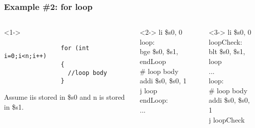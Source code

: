 \documentclass[
	10pt, %
	hmargin=1cm,vmargin=0cm,head=0.5cm,headsep=0pt,foot=0.5cm,margin=2cm
]{beamer}
\begin{document}
\begin{frame}[fragile]
	\frametitle{Example \#2: for loop}
	\begin{columns}[c]
		\begin{column}{0.3\textwidth}<1->
			\begin{listing}[H]
			\centering			
			\begin{verbatim}
				for (int i=0;i<n;i++)
				{
				  //loop body
				}
			\end{verbatim}
			\end{listing}
			\begin{flushleft}
				Assume \color{red}i\color{black}\hspace{0.1cm}is stored in \color{red}\$s0\color{black}\hspace{0.1cm} and \color{red}n\color{black}\hspace{0.1cm} is stored in \color{red}\$s1\color{black}. \pause
			\end{flushleft}
		\end{column}
		\begin{column}{0.3\textwidth}<2->
			\color{blue}li \color{red}\$s0\color{black}, 0 \\
			loop: \\
			\color{blue}bge \color{red}\$s0\color{black}, \color{red}\$s1\color{black}, endLoop \\
			\# loop body \\
			\color{blue}addi \color{red}\$s0\color{black}, \color{red}\$s0\color{black}, 1 \\
			\color{blue}j \color{black}loop \\
			endLoop:  \\
			... \\
		\end{column}
		\begin{column}{0.3\textwidth}<3->
			\color{blue}li \color{red}\$s0\color{black}, 0 \\
			loopCheck: \\
			\color{blue}blt \color{red}\$s0\color{black}, \color{red}\$s1\color{black}, loop \\
			... \\
			loop: \\
			\# loop body \\
			\color{blue}addi \color{red}\$s0\color{black}, \color{red}\$s0\color{black}, 1 \\
			\color{blue}j \color{black}loopCheck \\
		\end{column}
	\end{columns}
\end{frame}
\end{document}
